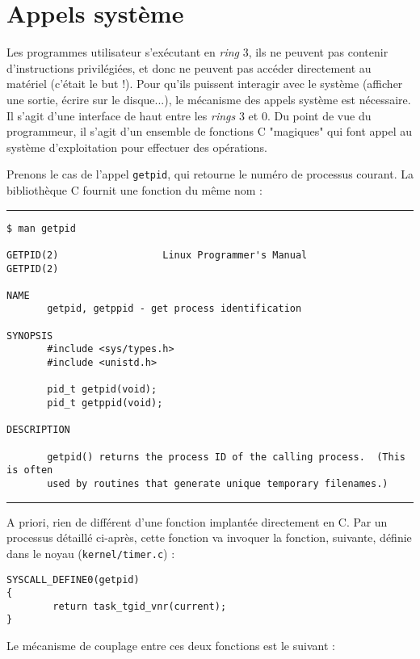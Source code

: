 \section{Appels système}

Les programmes utilisateur s'exécutant en \emph{ring} 3, ils ne peuvent pas
contenir d'instructions privilégiées, et donc ne peuvent pas accéder directement
au matériel (c'était le but !). Pour qu'ils puissent interagir avec le système
(afficher une sortie, écrire sur le disque...), le mécanisme des appels système
est nécessaire. Il s'agit d'une interface de haut entre les \emph{rings} 3 et 0.
Du point de vue du programmeur, il s'agit d'un ensemble de fonctions C
"magiques" qui font appel au système d'exploitation pour effectuer des
opérations.

Prenons le cas de l'appel \texttt{getpid}, qui retourne le numéro de processus
courant. La bibliothèque C fournit une fonction du même nom :

\begin{center}\rule{3in}{0.4pt}\end{center}
\begin{Verbatim}
$ man getpid

GETPID(2)                  Linux Programmer's Manual                  GETPID(2)

NAME
       getpid, getppid - get process identification

SYNOPSIS
       #include <sys/types.h>
       #include <unistd.h>

       pid_t getpid(void);
       pid_t getppid(void);

DESCRIPTION

       getpid() returns the process ID of the calling process.  (This is often
       used by routines that generate unique temporary filenames.)
\end{Verbatim}
\begin{center}\rule{3in}{0.4pt}\end{center}

A priori, rien de différent d'une fonction implantée directement en C. Par un
processus détaillé ci-après, cette fonction va invoquer la fonction, suivante,
définie dans le noyau (\texttt{kernel/timer.c}) :

\begin{Verbatim}
SYSCALL_DEFINE0(getpid)
{
        return task_tgid_vnr(current);
}
\end{Verbatim}

Le mécanisme de couplage entre ces deux fonctions est le suivant :

